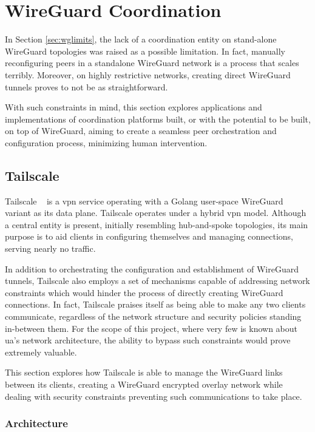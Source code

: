 \documentclass[11pt,twoside,a4paper]{report}
\begin{document}
\section{WireGuard Coordination}
\label{sec:coordination}

In Section \ref{sec:wglimits}, the lack of a coordination entity on stand-alone WireGuard topologies was raised as a possible limitation. In fact, manually reconfiguring peers in a standalone WireGuard network is a process that scales terribly. Moreover, on highly restrictive networks, creating direct WireGuard tunnels proves to not be as straightforward.

With such constraints in mind, this section explores applications and implementations of coordination platforms built, or with the potential to be built, on top of WireGuard, aiming to create a seamless peer orchestration and configuration process, minimizing human intervention.

\subsection{Tailscale}

Tailscale ~\cite{tailscale2020online} is a \ac{vpn} service operating with a Golang user-space WireGuard variant as its data plane. Tailscale operates under a hybrid \ac{vpn} model. Although a central entity is present, initially resembling hub-and-spoke topologies, its main purpose is to aid clients in configuring themselves and managing connections, serving nearly no traffic.

In addition to orchestrating the configuration and establishment of WireGuard tunnels, Tailscale also employs a set of mechanisms capable of addressing network constraints which would hinder the process of directly creating WireGuard connections. In fact, Tailscale praises itself as being able to make any two clients communicate, regardless of the network structure and security policies standing in-between them. For the scope of this project, where very few is known about \ac{ua}'s network architecture, the ability to bypass such constraints would prove extremely valuable.

This section explores how Tailscale is able to manage the WireGuard links between its clients, creating a WireGuard encrypted overlay network while dealing with security constraints preventing such communications to take place.

\subsubsection{Architecture}
\end{document}
